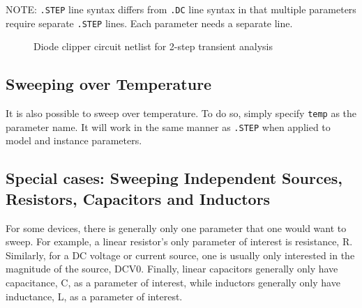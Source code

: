 NOTE: \verb|.STEP| line syntax differs from \verb|.DC| line syntax in
that multiple parameters require separate \verb|.STEP| lines. Each
parameter needs a separate line.

\begin{figure}[htbp]
\begin{centering}
\caption{Diode clipper circuit netlist for 2-step transient
analysis\label{Step_Netlist_2}}
\end{centering}
\end{figure}

\subsection{Sweeping over Temperature}
\label{step_Temperature}

It is also possible to sweep over temperature.  To do so, simply
specify \verb|temp| as the parameter name.  It will work in the same
manner as \verb|.STEP| when applied to model and instance parameters.

\subsection{Special cases: Sweeping Independent Sources, Resistors, Capacitors and Inductors}
\label{step_SpecialCases}

For some devices, there is generally only one parameter that one would
want to sweep.  For example, a linear resistor's only parameter of
interest is resistance, R.  Similarly, for a DC voltage or current
source, one is usually only interested in the magnitude of the source,
DCV0.  Finally, linear capacitors generally only have capacitance, C,
as a parameter of interest, while inductors generally only have
inductance, L, as a parameter of interest.

